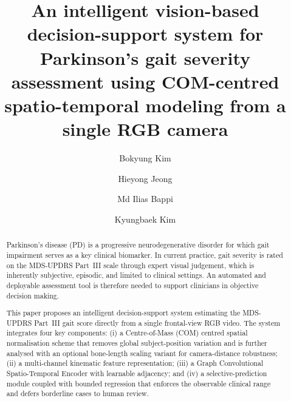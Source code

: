 \documentclass[preprint,12pt]{elsarticle}
\begin{document}
\begin{frontmatter}

\title{An intelligent vision-based decision-support system for
Parkinson's gait severity assessment using COM-centred
spatio-temporal modeling from a single RGB camera}

\author[cnu]{Bokyung Kim}
\author[cnu]{Hieyong Jeong}
\author[cnu]{Md Ilias Bappi}
\author[cnu]{Kyungbaek Kim}


\address[cnu]{Chonnam National University, Gwangju, Republic of Korea}

\begin{abstract}
Parkinson's disease (PD) is a progressive neurodegenerative disorder for
which gait impairment serves as a key clinical biomarker. In current
practice, gait severity is rated on the MDS-UPDRS Part~III scale through
expert visual judgement, which is inherently subjective, episodic, and
limited to clinical settings. An automated and deployable assessment tool
is therefore needed to support clinicians in objective decision making.

This paper proposes an intelligent decision-support system estimating
the MDS-UPDRS Part~III gait score directly from a single frontal-view RGB
video. The system integrates four key components: (i) a Centre-of-Mass (COM)
centred spatial normalisation scheme that removes global subject-position
variation and is further analysed with an optional bone-length scaling variant
for camera-distance robustness;
(ii) a multi-channel kinematic feature representation; (iii) a Graph
Convolutional Spatio-Temporal Encoder with learnable adjacency; and (iv) a
selective-prediction module coupled with bounded regression that enforces the
observable clinical range and defers borderline cases to human review.


\end{abstract}
\end{frontmatter}
\end{document}
